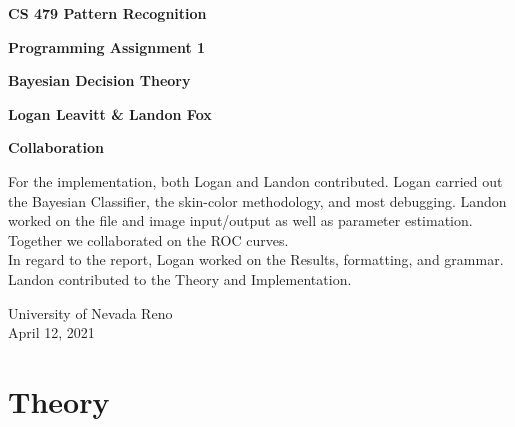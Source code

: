 \documentclass[ 12pt ]{article}
\begin{document}
\begin{titlepage}
    \begin{center}
        \vspace*{1cm}
            
        \LARGE
        \textbf{CS 479 Pattern Recognition}

        \vspace{0.5cm}
        \LARGE
        \textbf{Programming Assignment 1}

        \vspace{0.1cm}
        \LARGE
        \textbf{Bayesian Decision Theory}
            
        \vspace{1.5cm}
            
        \textbf{Logan Leavitt \& Landon Fox}
            
        \vfill
        \Large
        \textbf{Collaboration}

        \vspace{0.1cm}
        \large
        For the implementation, both Logan and Landon contributed. Logan carried out the Bayesian Classifier, the skin-color methodology, and most debugging. Landon worked on the
        file and image input/output as well as parameter estimation. Together we collaborated on the ROC curves. \\
        In regard to the report, Logan worked on the Results, formatting, and grammar. Landon contributed to the Theory and Implementation.
            
        \vspace{0.8cm}
            
            
        \Large
        University of Nevada Reno\\
        April 12, 2021
            
    \end{center}
\end{titlepage}


\section*{Theory}
\end{document}
